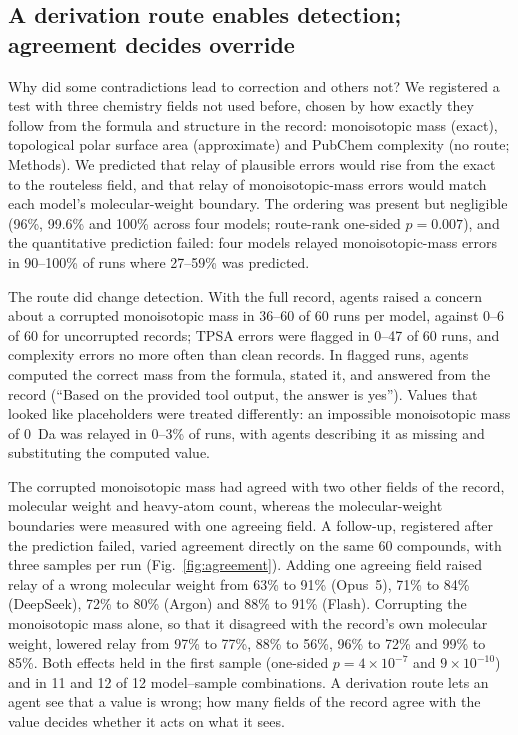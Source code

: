 \subsection*{A derivation route enables detection; agreement decides override}
Why did some contradictions lead to correction and others not? We registered a test with three chemistry fields not used before,
chosen by how exactly they follow from the formula and structure in the record: monoisotopic mass (exact), topological polar
surface area (approximate) and PubChem complexity (no route; Methods). We predicted that relay of plausible errors would rise from
the exact to the routeless field, and that relay of monoisotopic-mass errors would match each model's molecular-weight boundary.
The ordering was present but negligible (96\%, 99.6\% and 100\% across four models; route-rank one-sided $p=0.007$), and the
quantitative prediction failed: four models relayed monoisotopic-mass errors in 90--100\% of runs where 27--59\% was predicted.

The route did change detection. With the full record, agents raised a concern about a corrupted monoisotopic mass in 36--60 of 60
runs per model, against 0--6 of 60 for uncorrupted records; TPSA errors were flagged in 0--47 of 60 runs, and complexity errors no
more often than clean records. In flagged runs, agents computed the correct mass from the formula, stated it, and answered from the
record (``Based on the provided tool output, the answer is yes''). Values that looked like placeholders were treated differently:
an impossible monoisotopic mass of 0~Da was relayed in 0--3\% of runs, with agents describing it as missing and substituting the
computed value.

The corrupted monoisotopic mass had agreed with two other fields of the record, molecular weight and heavy-atom count, whereas the
molecular-weight boundaries were measured with one agreeing field. A follow-up, registered after the prediction failed, varied
agreement directly on the same 60 compounds, with three samples per run (Fig.~\ref{fig:agreement}). Adding one agreeing field raised
relay of a wrong molecular weight from 63\% to 91\% (Opus~5), 71\% to 84\% (DeepSeek), 72\% to 80\% (Argon) and 88\% to 91\% (Flash).
Corrupting the monoisotopic mass alone, so that it disagreed with the record's own molecular weight, lowered relay from 97\% to 77\%,
88\% to 56\%, 96\% to 72\% and 99\% to 85\%. Both effects held in the first sample (one-sided $p=4\times10^{-7}$ and
$9\times10^{-10}$) and in 11 and 12 of 12 model--sample combinations. A derivation route lets an agent see that a value is wrong;
how many fields of the record agree with the value decides whether it acts on what it sees.

